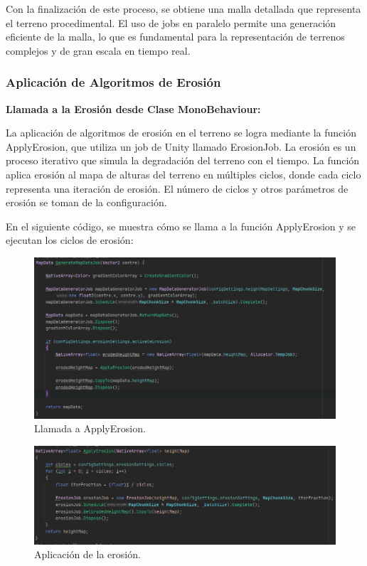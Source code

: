 Con la finalización de este proceso, se obtiene una malla detallada que representa el terreno procedimental. El uso de jobs en paralelo permite una generación eficiente de la malla, lo que es fundamental para la representación de terrenos complejos y de gran escala en tiempo real.

\subsubsection{Aplicación de Algoritmos de Erosión}

\textbf{Llamada a la Erosión desde Clase MonoBehaviour:}

La aplicación de algoritmos de erosión en el terreno se logra mediante la función ApplyErosion, que utiliza un job de Unity llamado ErosionJob. La erosión es un proceso iterativo que simula la degradación del terreno con el tiempo. La función aplica erosión al mapa de alturas del terreno en múltiples ciclos, donde cada ciclo representa una iteración de erosión. El número de ciclos y otros parámetros de erosión se toman de la configuración.

En el siguiente código, se muestra cómo se llama a la función ApplyErosion y se ejecutan los ciclos de erosión:

\begin{figure}[h]
    \centering
    \includegraphics[width=1\textwidth]{img/codes/ApplyErosionCall.png}
    \caption{Llamada a ApplyErosion.}
\end{figure}  

\begin{figure}[h]
    \centering
    \includegraphics[width=1\textwidth]{img/codes/ApplyErosionFunction.png}
    \caption{Aplicación de la erosión.}
\end{figure} 

